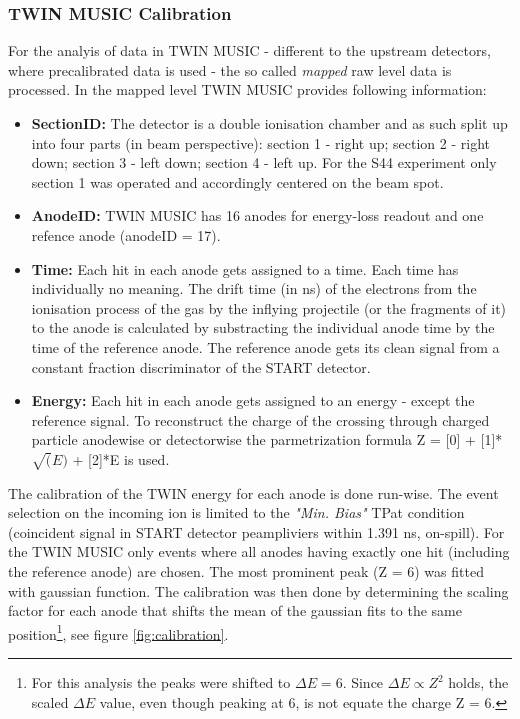 \subsubsection{TWIN MUSIC Calibration}
For the analyis of data in TWIN MUSIC - different to the upstream detectors, where precalibrated data is used - the so called \textit{mapped} raw level data is processed. In the mapped level TWIN MUSIC provides following information:
\begin{itemize}
\itemsep0em 
\item \textbf{SectionID:} The detector is a double ionisation chamber and as such split up into four parts (in beam perspective): section 1 - right up; section 2 - right down; section 3 - left down; section 4 - left up. For the S44 experiment only section 1 was operated and accordingly centered on the beam spot.
\item \textbf{AnodeID:} TWIN MUSIC has 16 anodes for energy-loss readout and one refence anode (anodeID = 17).
\item \textbf{Time:} Each hit in each anode gets assigned to a time. Each time has individually no meaning. The drift time (in ns) of the electrons from the ionisation process of the gas by the inflying projectile (or the fragments of it) to the anode is calculated by substracting the individual anode time by the time of the reference anode. The reference anode gets its clean signal from a constant fraction discriminator of the START detector.
\item \textbf{Energy:} Each hit in each anode gets assigned to an energy - except the reference signal. To reconstruct the charge of the crossing through charged particle anodewise or detectorwise the parmetrization formula Z = [0] + [1]*$\sqrt(E)$ + [2]*E is used. 
\end{itemize}
The calibration of the TWIN energy for each anode is done run-wise. The event selection on the incoming ion is limited to the  \textit{"Min. Bias"} TPat condition (coincident signal in START detector peampliviers within 1.391 ns, on-spill). For the TWIN MUSIC only events where all anodes having exactly one hit (including the reference anode) are chosen. The most prominent peak (Z = 6) was fitted with gaussian function. The calibration was then done by determining the scaling factor for each anode  that shifts the mean of the gaussian fits to the same position\footnote{For this analysis the peaks were shifted to $\Delta E = 6$. Since $\Delta E \propto Z^2$ holds, the scaled $\Delta E$ value, even though peaking at 6, is not equate the charge Z = 6.}, see figure \ref{fig:calibration}.
